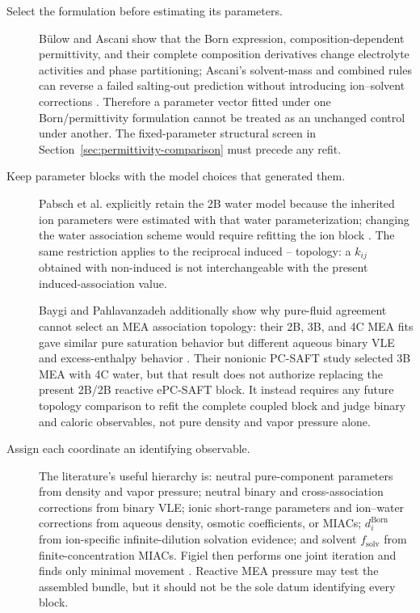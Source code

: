 \documentclass[10pt,oneside]{scrartcl}
\begin{document}
\begin{description}
\item[Select the formulation before estimating its parameters.] B\"ulow and
Ascani show that the Born expression, composition-dependent permittivity, and
their complete composition derivatives change electrolyte activities and
phase partitioning; Ascani's solvent-mass and combined rules can reverse a
failed salting-out prediction without introducing ion--solvent corrections
\cite[Secs.~3.2--4]{Bulow2020}\cite[pp.~1310--1313]{Ascani2021}. Therefore a
parameter vector fitted under one Born/permittivity formulation cannot be
treated as an unchanged control under another. The fixed-parameter structural
screen in Section~\ref{sec:permittivity-comparison} must precede any refit.

\item[Keep parameter blocks with the model choices that generated them.]
Pabsch et al. explicitly retain the 2B water model because the inherited ion
parameters were estimated with that water parameterization; changing the water
association scheme would require refitting the ion block
\cite[p.~5770]{Pabsch2020}. The same restriction applies to the reciprocal
induced -- topology: a $k_{ij}$ obtained with non-induced
 is not interchangeable with the present induced-association value.

Baygi and Pahlavanzadeh additionally show why pure-fluid agreement cannot
select an MEA association topology: their 2B, 3B, and 4C MEA fits gave similar
pure saturation behavior but different aqueous binary VLE and excess-enthalpy
behavior \cite[pp.~789, 795--799]{Baygi2015}. Their nonionic PC-SAFT study
selected 3B MEA with 4C water, but that result does not authorize replacing the
present 2B/2B reactive ePC-SAFT block. It instead requires any future topology
comparison to refit the complete coupled block and judge binary and caloric
observables, not pure density and vapor pressure alone.

\item[Assign each coordinate an identifying observable.] The literature's
useful hierarchy is: neutral pure-component parameters from density and vapor
pressure; neutral binary and cross-association corrections from binary VLE;
ionic short-range parameters and ion--water corrections from aqueous density,
osmotic coefficients, or MIACs; $d_i^{\mathrm{Born}}$ from ion-specific
infinite-dilution solvation evidence; and solvent $f_{\mathrm{solv}}$ from
finite-concentration MIACs. Figiel then performs one joint iteration and finds
only minimal movement \cite[p.~9411]{Figiel2025}. Reactive MEA pressure may
test the assembled bundle, but it should not be the sole datum identifying
every block.


\end{description}
\end{document}
